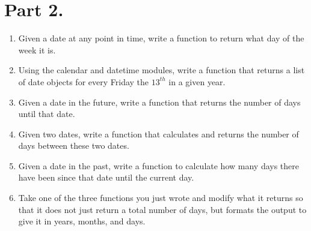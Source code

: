 \documentclass[11pt, letterpaper, onecolumn, oneside, final]{article}
\begin{document}
\section{Part 2.}
\begin{enumerate}
    \item Given a date at any point in time, write a function to return what day of the week it is.
    
    \item Using the {\consolas calendar} and {\consolas datetime} modules, write a function that returns a list of date objects for every Friday the $13^{th}$ in a given year.
    
    \item Given a date in the future, write a function that returns the number of days until that date.
    
    \item Given two dates, write a function that calculates and returns the number of days between these two dates.
    
    \item Given a date in the past, write a function to calculate how many days there have been since that date until the current day.
    
    \item Take one of the three functions you just wrote and modify what it returns so that it does not just return a total number of days, but formats the output to give it in years, months, and days.
    

\end{enumerate}
\end{document}
